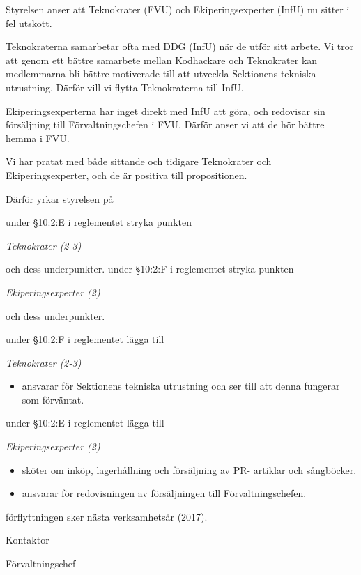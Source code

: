 \documentclass[../main/handlingar.tex]{subfiles}
\begin{document}

Styrelsen anser att Teknokrater (FVU) och Ekiperingsexperter (InfU) nu sitter i fel utskott.

Teknokraterna samarbetar ofta med DDG (InfU) när de utför sitt arbete. Vi tror att genom ett bättre samarbete mellan Kodhackare och Teknokrater kan medlemmarna bli bättre motiverade till att utveckla Sektionens tekniska utrustning. Därför vill vi flytta Teknokraterna till InfU.

Ekiperingsexperterna har inget direkt med InfU att göra, och redovisar sin försäljning till Förvaltningschefen i FVU. Därför anser vi att de hör bättre hemma i FVU.

Vi har pratat med både sittande och tidigare Teknokrater och Ekiperingsexperter, och de är positiva till propositionen.

Därför yrkar styrelsen på
\begin{attsatser}
    \att under \S10:2:E i reglementet stryka punkten\par
    {\it
    Teknokrater (2-3)
    }\par
    och dess underpunkter.
    \att under \S10:2:F i reglementet stryka punkten\par
    {\it
    Ekiperingsexperter (2)
    }\par
    och dess underpunkter.

    \att under \S10:2:F i reglementet lägga till\par
    {\it
    Teknokrater (2-3)
    \begin{itemize}[label={--}, topsep=0cm, noitemsep]
        \item ansvarar för Sektionens tekniska utrustning och ser till att denna fungerar som förväntat.
    \end{itemize}
    }

    \att under \S10:2:E i reglementet lägga till\par
    {\it
    Ekiperingsexperter (2)
    \begin{itemize}[label={--}, topsep=0cm, noitemsep]
        \item sköter om inköp, lagerhållning och försäljning av PR- artiklar och sångböcker.
        \item ansvarar för redovisningen av försäljningen till Förvaltningschefen.
    \end{itemize}
    }
    \att förflyttningen sker nästa verksamhetsår (2017).
\end{attsatser}

\begin{signatures}{2}
    \ist
    \signature{Erik Månsson}{Kontaktor}
    \signature{Anders Nilsson}{Förvaltningschef}
\end{signatures}
\end{document}
